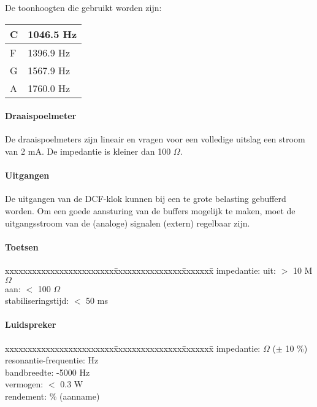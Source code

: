De toonhoogten die gebruikt worden zijn:

\begin{tabular}{||l|l||} \hline
C & 1046.5 Hz \\ \hline
F & 1396.9 Hz \\ \hline
G & 1567.9 Hz \\ \hline
A & 1760.0 Hz \\ \hline
\end{tabular}


\paragraph{Draaispoelmeter}

De draaispoelmeters zijn lineair en vragen voor een volledige uitslag
een stroom van 2 mA. De impedantie is kleiner dan 100 $\Omega$.

\paragraph{Uitgangen}

De uitgangen van de DCF-klok kunnen bij een te grote belasting
gebufferd worden. Om een goede aansturing van de buffers mogelijk te
maken, moet de uitgangsstroom van de (analoge) signalen (extern)
regelbaar zijn.

\paragraph{Toetsen}

\begin{tabbing}
xxxxxxxxxxxxxxxxxxxxxxxx\=xxxxxxxxxxxxxxx\=xxxxxxx\=\kill
impedantie:             \>uit:          \>$>$ 10 M$\Omega$\\
                        \>aan:          \>$<$ 100 $\Omega$\\
stabiliseringstijd:     \>$<$ 50 ms\\
\end{tabbing}


\paragraph{Luidspreker}

\begin{tabbing}
xxxxxxxxxxxxxxxxxxxxxxxx\=xxxxxxxxxxxxxxx\=xxxxxxx\=\kill
impedantie:              $\Omega$ ($\pm$ 10 \%)\\
resonantie-frequentie:   Hz\\
bandbreedte:            -5000 Hz\\
vermogen:               \>$<$ 0.3 W\\
rendement:               \% (aanname)\\
\end{tabbing}



